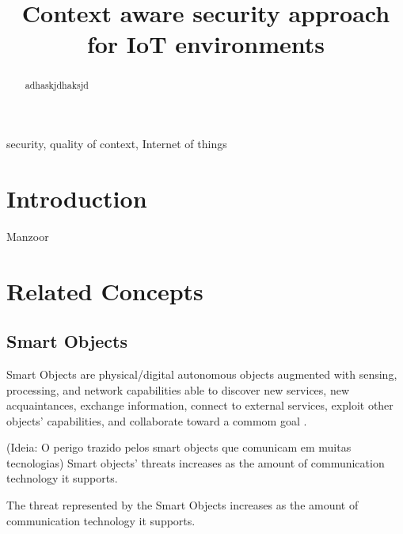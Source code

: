 \documentclass[letterpaper,conference]{IEEEtran}
\begin{document}
\title{Context aware security approach for IoT environments}
\author{
}

\maketitle

\begin{abstract}
adhaskjdhaksjd
\end{abstract}

\begin{IEEEkeywords}
security, quality of context, Internet of things
\end{IEEEkeywords}

\IEEEpeerreviewmaketitle

\section{Introduction}

Manzoor \cite{manzoor2009quality}

\section{Related Concepts} 

\subsection{Smart Objects}
Smart Objects are physical/digital autonomous objects augmented with sensing, processing, 
and network capabilities able to discover new services, new acquaintances, exchange information, 
connect to external services, exploit other objects’ capabilities, and collaborate toward a 
commom goal \cite{kortuem2010smart} \cite{atzori2014smart}.

(Ideia: O perigo trazido pelos smart objects que comunicam em muitas tecnologias)
Smart objects' threats increases as the amount of communication technology it supports.

The threat represented by the Smart Objects increases as the amount of communication technology it supports.
\end{document}
